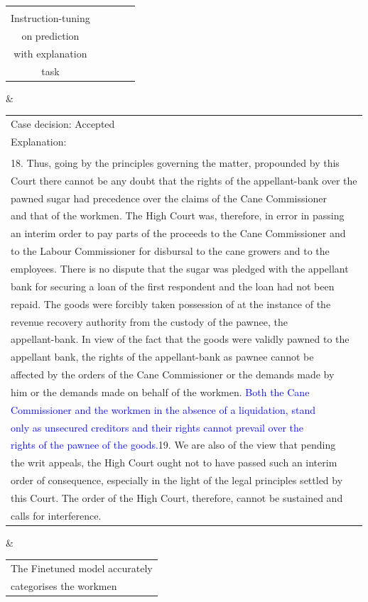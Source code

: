 \begin{table}[t]
{\begin{tabular}{|c|l|l|ll}
\begin{tabular}[c]{@{}c@{}}Llama-2-7B \\ Instruction-tuning\\ on prediction \\ with explanation\\ task\end{tabular} & \begin{tabular}[c]{@{}l@{}}Case decision: Accepted\\ Explanation:\\ \\ 18. Thus, going by the principles governing the matter, propounded by this \\ Court there cannot be any doubt that the rights of the appellant-bank over the\\  pawned sugar had precedence over the claims of the Cane Commissioner\\  and that of the workmen. The High Court was, therefore, in error in passing \\ an interim order to pay parts of the proceeds to the Cane Commissioner and\\  to the Labour Commissioner for disbursal to the cane growers and to the \\ employees. There is no dispute that the sugar was pledged with the appellant\\  bank for securing a loan of the first respondent and the loan had not been \\ repaid. The goods were forcibly taken possession of at the instance of the \\ revenue recovery authority from the custody of the pawnee, the \\ appellant-bank. In view of the fact that the goods were validly pawned to the\\  appellant bank, the rights of the appellant-bank as pawnee cannot be\\  affected by the orders of the Cane Commissioner or the demands made by\\  him or the demands made on behalf of the workmen. \textcolor{blue}{Both the Cane}\\  \textcolor{blue}{Commissioner and the workmen in the absence of a liquidation, stand} \\ \textcolor{blue}{only as unsecured creditors and their rights cannot prevail over the} \\ \textcolor{blue}{rights of the pawnee of the goods.}19. We are also of the view that pending\\  the writ appeals, the High Court ought not to have passed such an interim\\  order of consequence, especially in the light of the legal principles settled by\\  this Court. The order of the High Court, therefore, cannot be sustained and \\ calls for interference.\end{tabular}                                      & \begin{tabular}[c]{@{}l@{}}The Finetuned model accurately \\ categorises the workmen 
\end{tabular}}
\end{table}
